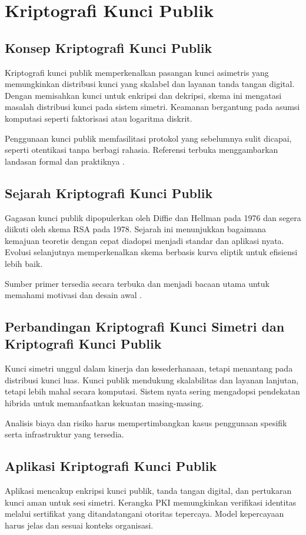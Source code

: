 \documentclass[../main.tex]{subfiles}
\begin{document}
\chapter{Kriptografi Kunci Publik}

\section{Konsep Kriptografi Kunci Publik}
Kriptografi kunci publik memperkenalkan pasangan kunci asimetris yang memungkinkan distribusi kunci yang skalabel dan layanan tanda tangan digital. Dengan memisahkan kunci untuk enkripsi dan dekripsi, skema ini mengatasi masalah distribusi kunci pada sistem simetri. Keamanan bergantung pada asumsi komputasi seperti faktorisasi atau logaritma diskrit.

Penggunaan kunci publik memfasilitasi protokol yang sebelumnya sulit dicapai, seperti otentikasi tanpa berbagi rahasia. Referensi terbuka menggambarkan landasan formal dan praktiknya \parencite{diffie1976new}.

\section{Sejarah Kriptografi Kunci Publik}
Gagasan kunci publik dipopulerkan oleh Diffie dan Hellman pada 1976 dan segera diikuti oleh skema RSA pada 1978. Sejarah ini menunjukkan bagaimana kemajuan teoretis dengan cepat diadopsi menjadi standar dan aplikasi nyata. Evolusi selanjutnya memperkenalkan skema berbasis kurva eliptik untuk efisiensi lebih baik.

Sumber primer tersedia secara terbuka dan menjadi bacaan utama untuk memahami motivasi dan desain awal \parencite{diffie1976new,rsa1978}.

\section{Perbandingan Kriptografi Kunci Simetri dan Kriptografi Kunci Publik}
Kunci simetri unggul dalam kinerja dan kesederhanaan, tetapi menantang pada distribusi kunci luas. Kunci publik mendukung skalabilitas dan layanan lanjutan, tetapi lebih mahal secara komputasi. Sistem nyata sering mengadopsi pendekatan hibrida untuk memanfaatkan kekuatan masing-masing.

Analisis biaya dan risiko harus mempertimbangkan kasus penggunaan spesifik serta infrastruktur yang tersedia.

\section{Aplikasi Kriptografi Kunci Publik}
Aplikasi mencakup enkripsi kunci publik, tanda tangan digital, dan pertukaran kunci aman untuk sesi simetri. Kerangka PKI memungkinkan verifikasi identitas melalui sertifikat yang ditandatangani otoritas tepercaya. Model kepercayaan harus jelas dan sesuai konteks organisasi.
\end{document}

